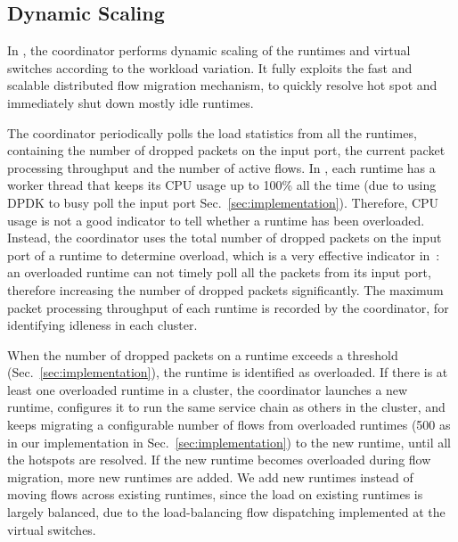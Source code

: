 \subsection{Dynamic Scaling}
\label{sec:scaling}

In \nfactor, the coordinator performs dynamic scaling of the runtimes and virtual switches according to the workload variation. It fully exploits the fast and scalable distributed flow migration mechanism, to quickly resolve hot spot and immediately shut down mostly idle runtimes.

The coordinator periodically polls the load statistics from all the runtimes, containing the number of dropped packets on the input port, the current packet processing throughput and the number of active flows.
In \nfactor, each runtime has a worker thread that keeps its CPU usage up to 100\% all the time (due to using DPDK to busy poll the input port Sec.~\ref{sec:implementation}). Therefore, CPU usage is not a good indicator to tell whether a runtime has been overloaded. Instead, the coordinator uses the total number of dropped packets on the input port of a runtime to determine overload, which is a very effective indicator in~\nfactor: an overloaded runtime can not timely poll all the packets from its input port, therefore increasing the number of dropped packets significantly. The maximum packet processing throughput of each runtime %
is recorded by the coordinator, for identifying idleness in each cluster. %

When the number of dropped packets on a runtime exceeds a threshold (Sec.~\ref{sec:implementation}), the runtime is identified as overloaded. If there is at least one overloaded runtime in a cluster, the coordinator launches a new runtime, configures it to run the same service chain as others in the cluster, and keeps migrating a configurable number of flows from overloaded runtimes (500 as in our implementation in Sec.~\ref{sec:implementation}) to the new runtime, until all the hotspots are resolved. If the new runtime becomes overloaded during flow migration, more new runtimes are added. We add new runtimes instead of moving flows across existing runtimes, since the load on existing runtimes is largely balanced, due to the load-balancing flow dispatching implemented at the virtual switches.

